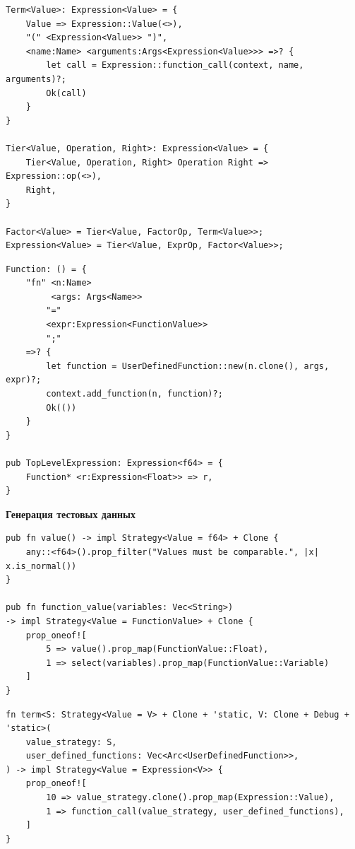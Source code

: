 \begin{frame}[fragile]
    \begin{verbatim}
Term<Value>: Expression<Value> = {
    Value => Expression::Value(<>),
    "(" <Expression<Value>> ")",
    <name:Name> <arguments:Args<Expression<Value>>> =>? {
        let call = Expression::function_call(context, name, arguments)?;
        Ok(call)
    }
}

Tier<Value, Operation, Right>: Expression<Value> = {
    Tier<Value, Operation, Right> Operation Right => Expression::op(<>),
    Right,
}

Factor<Value> = Tier<Value, FactorOp, Term<Value>>;
Expression<Value> = Tier<Value, ExprOp, Factor<Value>>;
    \end{verbatim}
\end{frame}

\begin{frame}[fragile]
    \begin{verbatim}
Function: () = {
    "fn" <n:Name>
         <args: Args<Name>>
        "="
        <expr:Expression<FunctionValue>>
        ";"
    =>? {
        let function = UserDefinedFunction::new(n.clone(), args, expr)?;
        context.add_function(n, function)?;
        Ok(())
    }
}

pub TopLevelExpression: Expression<f64> = {
    Function* <r:Expression<Float>> => r,
}
    \end{verbatim}
\end{frame}

\begin{frame}
  \textbf{Генерация тестовых данных}
\end{frame}

\begin{frame}[fragile]
    \begin{verbatim}
pub fn value() -> impl Strategy<Value = f64> + Clone {
    any::<f64>().prop_filter("Values must be comparable.", |x| x.is_normal())
}

pub fn function_value(variables: Vec<String>)
-> impl Strategy<Value = FunctionValue> + Clone {
    prop_oneof![
        5 => value().prop_map(FunctionValue::Float),
        1 => select(variables).prop_map(FunctionValue::Variable)
    ]
}
    \end{verbatim}
\end{frame}

\begin{frame}[fragile]
    \begin{verbatim}
fn term<S: Strategy<Value = V> + Clone + 'static, V: Clone + Debug + 'static>(
    value_strategy: S,
    user_defined_functions: Vec<Arc<UserDefinedFunction>>,
) -> impl Strategy<Value = Expression<V>> {
    prop_oneof![
        10 => value_strategy.clone().prop_map(Expression::Value),
        1 => function_call(value_strategy, user_defined_functions),
    ]
}
    \end{verbatim}
\end{frame}

